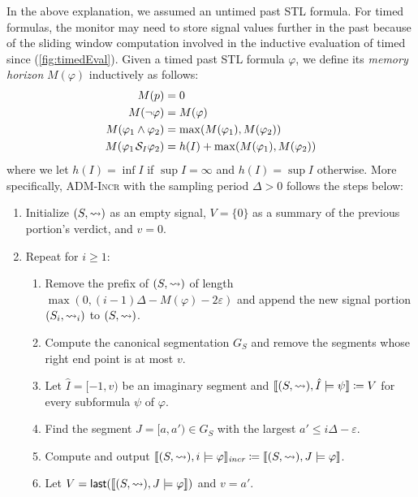 In the above explanation, we assumed an untimed past STL formula.
For timed formulas, the monitor may need to store signal values further in the past because of the sliding window computation involved in the inductive evaluation of timed since (\cref{fig:timedEval}).
Given a timed past STL formula $\varphi$, we define its \emph{memory horizon} $M(\varphi)$ inductively as follows:
\begin{align*}
	M(p) &= 0 \\
	M(\lnot \varphi) &= M(\varphi) \\
	M(\varphi_1 \land \varphi_2) &= \max(M(\varphi_1), M(\varphi_2))\\
	M(\varphi_1 \kern.1em\mathcal{S}_I \varphi_2) &= h(I) + \max(M(\varphi_1), M(\varphi_2))
\end{align*}
where we let $h(I) = \inf I$ if $\sup I = \infty$ and $h(I) = \sup I$ otherwise.
More specifically, \textsc{ADM-Incr} with the sampling period $\Delta > 0$ follows the steps below:
\begin{enumerate}[label*=\arabic*.]
	\item Initialize $(S,{\rightsquigarrow})$ as an empty signal, $V = \{0\}$ as a summary of the previous portion's verdict, and $v = 0$.
	\item Repeat for $i \geq 1$:
	\begin{enumerate}[leftmargin=5pt,label*=\arabic*]
		\item Remove the prefix of $(S,{\rightsquigarrow})$ of length $\max(0, (i-1)\Delta - M(\varphi) - 2\varepsilon)$ and append the new signal portion $(S_i,{\rightsquigarrow}_i)$ to $(S,{\rightsquigarrow})$.
		\item Compute the canonical segmentation $G_S$ and remove the segments whose right end point is at most $v$.
		\item Let $\hat{I} = [-1, v)$ be an imaginary segment and $\llbracket (S, {\rightsquigarrow}), \hat{I} \models \psi \rrbracket \coloneqq V$ for every subformula $\psi$ of $\varphi$.
		\item Find the segment $J = [a, a') \in G_S$ with the largest $a' \leq i\Delta-\varepsilon$.
		\item Compute and output $\llbracket (S, {\rightsquigarrow}), i \models \varphi \rrbracket_{\textit{incr}} \coloneqq \llbracket (S, {\rightsquigarrow}), J \models \varphi \rrbracket$.
		\item Let $V = \textsf{last}(\llbracket (S, {\rightsquigarrow}), J \models \varphi \rrbracket)$ and $v = a'$.
	\end{enumerate}
\end{enumerate}
